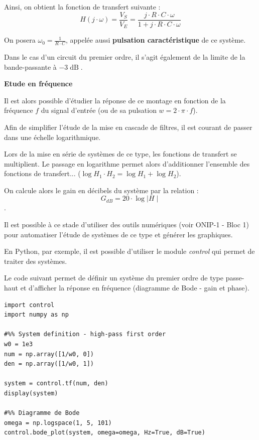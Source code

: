 \documentclass[a4paper,french]{paper}
\begin{document}
Ainsi, on obtient la fonction de transfert suivante : 
$$\boxed{ H(j \cdot \omega) = \frac{V_S}{V_E} = \frac{j \cdot R \cdot C \cdot \omega}{1 + j \cdot R \cdot C \cdot \omega} }$$

On posera $\omega_0 = \frac{1}{R \cdot C}$, appelée aussi \textbf{pulsation caractéristique} de ce système. 

Dans le cas d'un circuit du premier ordre, il s'agit également de la limite de la bande-passante à $-3\operatorname{dB}$.

\noindent\hrulefill

\textbf{Etude en fréquence}

Il est alors possible d'étudier la réponse de ce montage en fonction de la fréquence $f$ du signal d'entrée (ou de sa pulsation $w = 2 \cdot \pi \cdot f$).

Afin de simplifier l'étude de la mise en cascade de filtres, il est courant de passer dans une échelle logarithmique.

Lors de la mise en série de systèmes de ce type, les fonctions de transfert se multiplient. Le passage en logarithme permet alors d'additionner l'ensemble des fonctions de transfert... ($\log{H_1 \cdot H_2} = \log{H_1} + \log{H_2}$).

On calcule alors le gain en décibels du système par la relation : $$\boxed{G_{dB} = 20 \cdot \log{ \mid H \mid }}$$.

\medskip

Il est possible à ce stade d'utiliser des outils numériques (voir ONIP-1 - Bloc 1) pour automatiser l'étude de systèmes de ce type et générer les graphiques.

En Python, par exemple, il est possible d'utiliser le module \textit{control} qui permet de traiter des systèmes.

Le code suivant permet de définir un système du premier ordre de type passe-haut et d'afficher la réponse en fréquence (diagramme de Bode - gain et phase).

\begin{lstlisting}
import control
import numpy as np

#%% System definition - high-pass first order
w0 = 1e3
num = np.array([1/w0, 0])
den = np.array([1/w0, 1])

system = control.tf(num, den)
display(system)

#%% Diagramme de Bode
omega = np.logspace(1, 5, 101)
control.bode_plot(system, omega=omega, Hz=True, dB=True)
\end{lstlisting}
\end{document}
